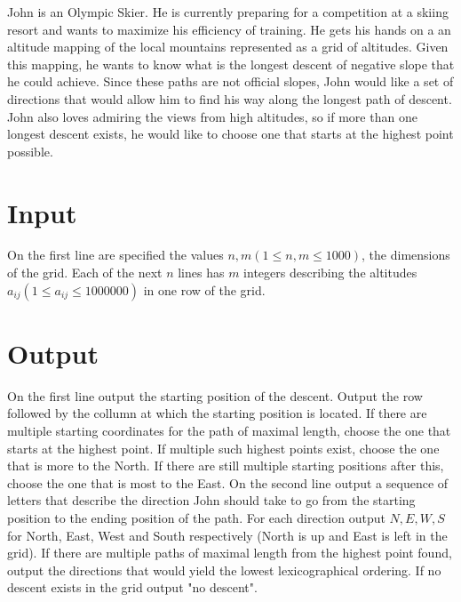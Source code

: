 John is an Olympic Skier. He is currently preparing for a competition at a skiing resort and wants to maximize his efficiency of training. He gets his hands on a an altitude mapping of the local mountains represented as a grid of altitudes. Given this mapping, he wants to know what is the longest descent of negative slope that he could achieve. Since these paths are not official slopes, John would like a set of directions that would allow him to find his way along the longest path of descent. John also loves admiring the views from high altitudes, so if more than one longest descent exists, he would like to choose one that starts at the highest point possible.

\section*{Input}
On the first line are specified the values $n, m (1 \leq n, m \leq 1000)$, the dimensions of the grid.
Each of the next $n$ lines has $m$ integers describing the altitudes $a_{ij} (1 \leq a_{ij} \leq 1000000)$ in one row of the grid.

\section*{Output}
On the first line output the starting position of the descent. Output the row followed by the collumn at which the starting position is located. If there are multiple starting coordinates for the path of maximal length, choose the one that starts at the highest point. If multiple such highest points exist, choose the one that is more to the North. If there are still multiple starting positions after this, choose the one that is most to the East.
On the second line output a sequence of letters that describe the direction John should take to go from the starting position to the ending position of the path. For each direction output $N, E, W, S$ for North, East, West and South respectively (North is up and East is left in the grid). If there are multiple paths of maximal length from the highest point found, output the directions that would yield the lowest lexicographical ordering. 
If no descent exists in the grid output "no descent".
